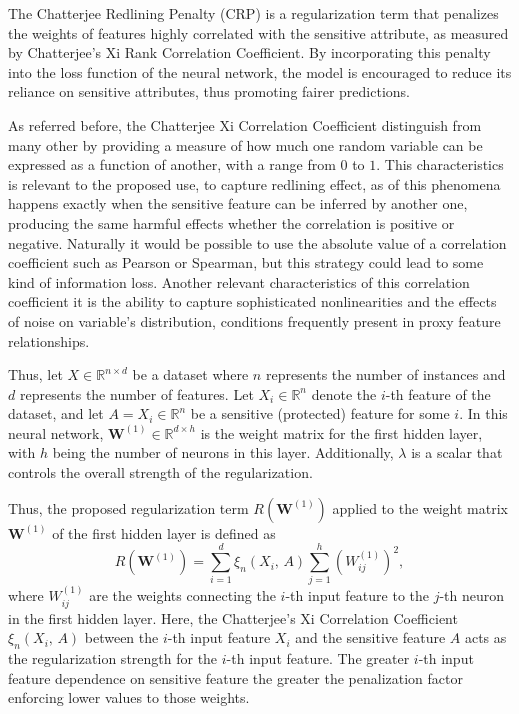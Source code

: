 The Chatterjee Redlining Penalty (CRP) is a regularization term that penalizes the weights of features highly correlated with the sensitive attribute, as measured by Chatterjee's Xi Rank Correlation Coefficient. By incorporating this penalty into the loss function of the neural network, the model is encouraged to reduce its reliance on sensitive attributes, thus promoting fairer predictions.

As referred before, the Chatterjee Xi Correlation Coefficient distinguish from many other by providing a measure of how much one random variable can be expressed as a function of another, with a range from $0$ to $1$. This characteristics is relevant to the proposed use, to capture redlining effect, as of this phenomena happens exactly when the sensitive feature can be inferred by another one, producing the same harmful effects whether the correlation is positive or negative. Naturally it would be possible to use the absolute value of a correlation coefficient such as Pearson or Spearman, but this strategy could lead to some kind of information loss. Another relevant characteristics of this correlation coefficient it is the ability to capture sophisticated nonlinearities and the effects of noise on variable's distribution, conditions frequently present in proxy feature relationships. 

Thus, let $X \in \mathbb{R}^{n \times d}$ be a dataset where $n$ represents the number of instances and $d$ represents the number of features. Let $X_i \in \mathbb{R}^n$ denote the $i$-th feature of the dataset, and let $A = X_i \in \mathbb{R}^n$ be a sensitive (protected) feature for some $i$. In this neural network, $\mathbf{W}^{(1)} \in \mathbb{R}^{d \times h}$ is the weight matrix for the first hidden layer, with $h$ being the number of neurons in this layer. Additionally, $\lambda$ is a scalar that controls the overall strength of the regularization.

Thus, the proposed regularization term $R(\mathbf{W}^{(1)})$ applied to the weight matrix $\mathbf{W}^{(1)}$ of the first hidden layer is defined as 
\begin{equation}\label{eq:xi_reg}
R(\mathbf{W}^{(1)}) = \sum_{i=1}^d \xi_n(X_i,\,A) \sum_{j=1}^h (W^{(1)}_{ij})^2,
\end{equation}
where $W^{(1)}_{ij}$ are the weights connecting the $i$-th input feature to the $j$-th neuron in the first hidden layer. Here, the Chatterjee's Xi Correlation Coefficient $\xi_n(X_i,\,A)$ between the $i$-th input feature $X_i$ and the sensitive feature $A$ acts as the regularization strength for the $i$-th input feature. The greater $i$-th input feature dependence on sensitive feature the greater the penalization factor enforcing lower values to those weights.

